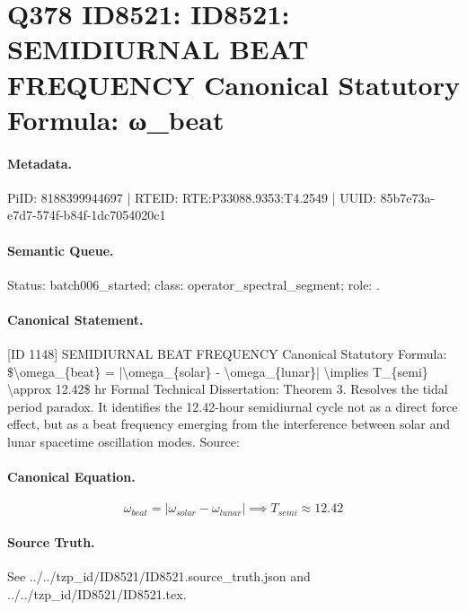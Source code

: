 \section*{Q378 ID8521: ID8521: SEMIDIURNAL BEAT FREQUENCY Canonical Statutory Formula: ω\_beat}
\paragraph{Metadata.}
PiID: 8188399944697 | RTEID: RTE:P33088.9353:T4.2549 | UUID: 85b7e73a-e7d7-574f-b84f-1dc7054020c1

\paragraph{Semantic Queue.}
Status: batch006\_started; class: operator\_spectral\_segment; role: .

\paragraph{Canonical Statement.}
[ID 1148] SEMIDIURNAL BEAT FREQUENCY Canonical Statutory Formula: \$\textbackslash{}omega\_\{beat\} = |\textbackslash{}omega\_\{solar\} - \textbackslash{}omega\_\{lunar\}| \textbackslash{}implies T\_\{semi\} \textbackslash{}approx 12.42\$ hr Formal Technical Dissertation: Theorem 3. Resolves the tidal period paradox. It identifies the 12.42-hour semidiurnal cycle not as a direct force effect, but as a beat frequency emerging from the interference between solar and lunar spacetime oscillation modes. Source:

\paragraph{Canonical Equation.}
\[
\omega_{beat} = |\omega_{solar} - \omega_{lunar}| \implies T_{semi} \approx 12.42
\]

\paragraph{Source Truth.}
See ../../tzp\_id/ID8521/ID8521.source\_truth.json and ../../tzp\_id/ID8521/ID8521.tex.
